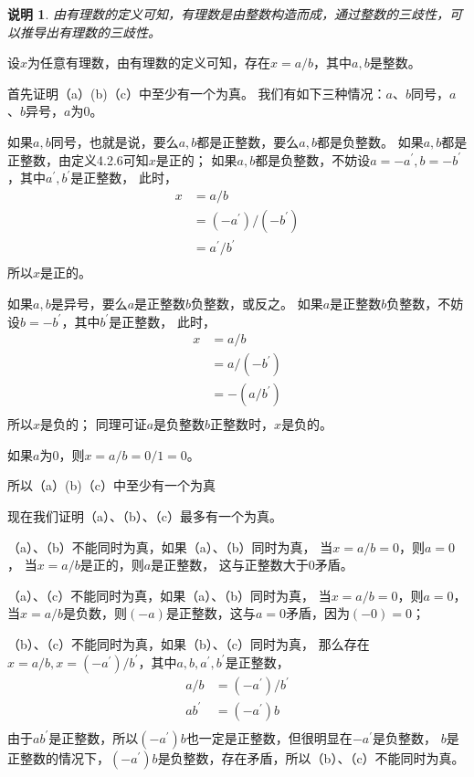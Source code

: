 \documentclass{article}
\theoremstyle{mystyle}
\newtheorem*{zremark}{说明}
\begin{document}
\begin{zgraytheorem}
  \begin{zremark}
    由有理数的定义可知，有理数是由整数构造而成，通过整数的三歧性，可以推导出有理数的三歧性。
  \end{zremark}
\end{zgraytheorem}

设$x$为任意有理数，由有理数的定义可知，存在$x=a/b$，其中$a,b$是整数。

首先证明（a）(b)（c）中至少有一个为真。
我们有如下三种情况：$a$、$b$同号，$a$、$b$异号，$a$为0。

如果$a,b$同号，也就是说，要么$a,b$都是正整数，要么$a,b$都是负整数。
如果$a,b$都是正整数，由定义4.2.6可知$x$是正的；
如果$a,b$都是负整数，不妨设$a=-a^\prime, b=-b^\prime$，其中$a^\prime,b^\prime$是正整数，
此时，
\begin{align*}
  x & = a/b                       \\
    & = (-a^\prime) / (-b^\prime) \\
    & = a^\prime / b^\prime       \\
\end{align*}
所以$x$是正的。

如果$a,b$是异号，要么$a$是正整数$b$负整数，或反之。
如果$a$是正整数$b$负整数，不妨设$b=-b^\prime$，其中$b^\prime$是正整数，
此时，
\begin{align*}
  x & = a/b           \\
    & = a/(-b^\prime) \\
    & = -(a/b^\prime) \\
\end{align*}
所以$x$是负的；
同理可证$a$是负整数$b$正整数时，$x$是负的。

如果$a$为0，则$x=a/b=0/1=0$。

所以（a）(b)（c）中至少有一个为真

现在我们证明（a）、（b）、（c）最多有一个为真。

（a）、（b）不能同时为真，如果（a）、（b）同时为真，
当$x=a/b=0$，则$a=0$，
当$x=a/b$是正的，则$a$是正整数，
这与正整数大于0矛盾。

（a）、（c）不能同时为真，如果（a）、（b）同时为真，
当$x=a/b=0$，则$a=0$，
当$x=a/b$是负数，则$(-a)$是正整数，这与$a=0$矛盾，因为$(-0)=0$；

（b）、（c）不能同时为真，如果（b）、（c）同时为真，
那么存在$x=a/b,x=(-a^\prime)/b^\prime$，其中$a,b,a^\prime,b^\prime$是正整数，
\begin{align*}
  a / b     & = (-a^\prime) / b^\prime \\
  ab^\prime & = (-a^\prime)b           \\
\end{align*}
由于$ab^\prime$是正整数，所以$(-a^\prime)b$也一定是正整数，但很明显在$-a^\prime$是负整数，
$b$是正整数的情况下，$(-a^\prime)b$是负整数，存在矛盾，所以（b）、（c）不能同时为真。
\end{document}
